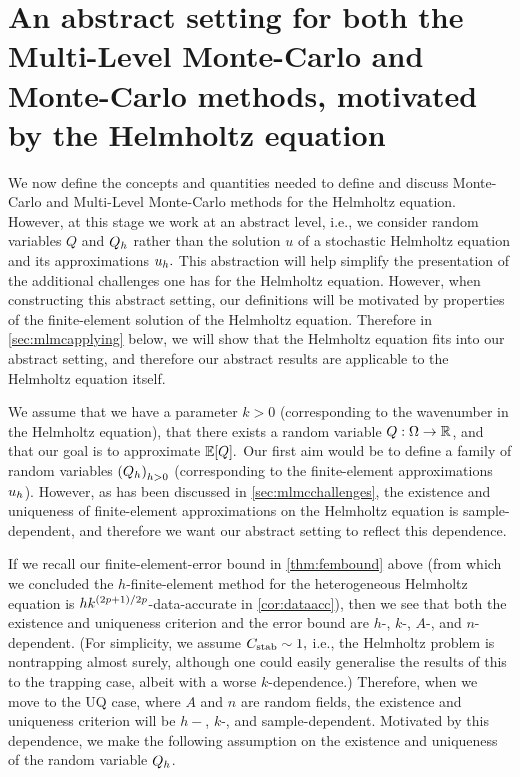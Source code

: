 \section[Abstract MC and MLMC setting]{An abstract setting for both the Multi-Level Monte-Carlo and Monte-Carlo methods, motivated by the Helmholtz equation}\label{sec:mlmcsetup}
We now define the concepts and quantities needed to define and discuss Monte-Carlo and Multi-Level Monte-Carlo methods for the Helmholtz equation. However, at this stage we work at an abstract level, i.e., we consider random variables $Q$ and $Q_{h}$ rather than the solution $u$ of a stochastic Helmholtz equation and its approximations $u_{h}.$ This abstraction will help simplify the presentation of the additional challenges one has for the Helmholtz equation. However, when constructing this abstract setting, our definitions will be motivated by properties of the finite-element solution of the Helmholtz equation. Therefore in \cref{sec:mlmcapplying} below, we will show that the Helmholtz equation fits into our abstract setting, and therefore our abstract results are applicable to the Helmholtz equation itself.

We assume that we have a parameter $k>0$ (corresponding to the wavenumber in the Helmholtz equation), that there exists a random variable $Q:\Omega\rightarrow\mathbb R$, and that our goal is to approximate $\EXP{Q}.$ Our first aim would be to define a family of random variables $\mleft(\Qh\mright)_{h>0}$ (corresponding to the finite-element approximations $u_{h}$). However, as has been discussed in \cref{sec:mlmcchallenges}, the existence and uniqueness of finite-element approximations on the Helmholtz equation is sample-dependent, and therefore we want our abstract setting to reflect this dependence.

If we recall our finite-element-error bound in \cref{thm:fembound} above (from which we concluded the $h$-finite-element method for the heterogeneous Helmholtz equation is $hk^{(2p+1)/2p}$-data-accurate in \cref{cor:dataacc}), then we see that both the existence and uniqueness criterion and the error bound are $h$-, $k$-, $A$-, and $n$-dependent. (For simplicity, we assume $C_{\mathrm{stab}} \sim 1,$ i.e., the Helmholtz problem is nontrapping almost surely, although one could easily generalise the results of this  to the trapping case, albeit with a worse $k$-dependence.) Therefore, when we move to the UQ case, where $A$ and $n$ are random fields, the existence and uniqueness criterion will be $h-$, $k$-, and sample-dependent. Motivated by this dependence, we make the following assumption on the existence and uniqueness of the random variable $Q_{h}$.

